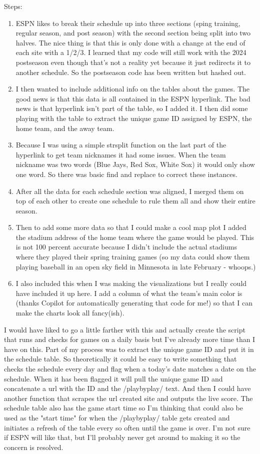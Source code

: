 \documentclass{article}
\begin{document}
Steps:
\begin{enumerate}
    \item ESPN likes to break their schedule up into three sections (sping training, regular season, and post season) with the second section being split into two halves. The nice thing is that this is only done with a change at the end of each site with a 1/2/3. I learned that my code will still work with the 2024 postseason even though that's not a reality yet because it just redirects it to another schedule. So the postseason code has been written but hashed out.
    \item I then wanted to include additional info on the tables about the games. The good news is that this data is all contained in the ESPN hyperlink. The bad news is that hyperlink isn't part of the table, so I added it. I then did some playing with the table to extract the unique game ID assigned by ESPN, the home team, and the away team.
    \item Because I was using a simple strsplit function on the last part of the hyperlink to get team nicknames it had some issues. When the team nickname was two words (Blue Jays, Red Sox, White Sox) it would only show one word. So there was basic find and replace to correct these instances.
    \item After all the data for each schedule section was aligned, I merged them on top of each other to create one schedule to rule them all and show their entire season.
    \item Then to add some more data so that I could make a cool map plot I added the stadium address of the home team where the game would be played. This is not 100 percent accurate because I didn't include the actual stadiums where they played their spring training games (so my data could show them playing baseball in an open sky field in Minnesota in late February - whoops.) 
    \item I also included this when I was making the visualizations but I really could have included it up here. I add a column of what the team's main color is (thanks Copilot for automatically generating that code for me!) so that I can make the charts look all fancy(ish).
\end{enumerate}

I would have liked to go a little farther with this and actually create the script that runs and checks for games on a daily basis but I've already more time than I have on this. Part of my process was to extract the unique game ID and put it in the schedule table. So theoretically it could be easy to write something that checks the schedule every day and flag when a today's date matches a date on the schedule. When it has been flagged it will pull the unique game ID and concatenate a url with the ID and the /playbyplay/ text. And then I could have another function that scrapes the url created site and outputs the live score. The schedule table also has the game start time so I'm thinking that could also be used as the "start time" for when the /playbyplay/ table gets created and initiates a refresh of the table every so often until the game is over. I'm not sure if ESPN will like that, but I'll probably never get around to making it so the concern is resolved.
\end{document}
